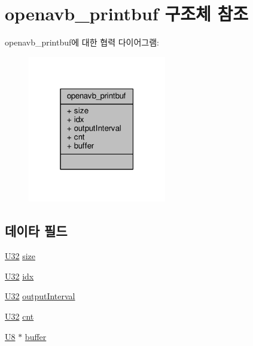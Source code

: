 \hypertarget{structopenavb__printbuf}{}\section{openavb\+\_\+printbuf 구조체 참조}
\label{structopenavb__printbuf}


openavb\+\_\+printbuf에 대한 협력 다이어그램\+:
\nopagebreak
\begin{figure}[H]
\begin{center}
\leavevmode
\includegraphics[width=171pt]{structopenavb__printbuf__coll__graph}
\end{center}
\end{figure}
\subsection*{데이타 필드}
\begin{DoxyCompactItemize}
\item 
\hyperlink{openavb__types__base__pub_8h_a696390429f2f3b644bde8d0322a24124}{U32} \hyperlink{structopenavb__printbuf_a48d1688d27e52f04e303777351a4779a}{size}
\item 
\hyperlink{openavb__types__base__pub_8h_a696390429f2f3b644bde8d0322a24124}{U32} \hyperlink{structopenavb__printbuf_af782e1749c5ec70098cf26c9c5c90f6c}{idx}
\item 
\hyperlink{openavb__types__base__pub_8h_a696390429f2f3b644bde8d0322a24124}{U32} \hyperlink{structopenavb__printbuf_ad5c88a8a57653f0cd93e5d01b9a2700f}{output\+Interval}
\item 
\hyperlink{openavb__types__base__pub_8h_a696390429f2f3b644bde8d0322a24124}{U32} \hyperlink{structopenavb__printbuf_abe5857ca0e41a9da956c09127e4d9309}{cnt}
\item 
\hyperlink{openavb__types__base__pub_8h_aa63ef7b996d5487ce35a5a66601f3e73}{U8} $\ast$ \hyperlink{structopenavb__printbuf_a5650d6922748fed794d7b3934873eb2f}{buffer}
\end{DoxyCompactItemize}


